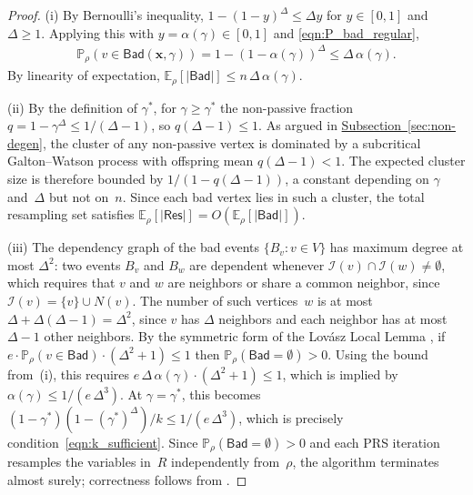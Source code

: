 \documentclass[12pt, a4paper]{article}
\theoremstyle{plain}
\theoremstyle{definition}
\theoremstyle{remark}
\newcommand{\mc}{\mathcal}
\newcommand{\mbb}{\mathbb}
\renewcommand{\v}[1]{\boldsymbol{#1}}
\newcommand{\mx}{\v{x}}
\newcommand{\sref}[2]{\hyperref[#2]{#1~\ref*{#2}}}
\newcommand{\bad}{\mathsf{Bad}}
\newcommand{\res}{\mathsf{Res}}
\begin{document}
\begin{proof}
(i) By Bernoulli's inequality, \(1-(1-y)^{\Delta}\leq \Delta y\) for \(y\in[0,1]\) and \(\Delta\geq1\). Applying this with \(y=\alpha(\gamma)\in[0,1]\) and \eqref{eqn:P_bad_regular},
\begin{align*}
\mbb P_\rho(v\in\bad(\mx,\gamma)) = 1-\left(1-\alpha(\gamma)\right)^{\Delta} \leq \Delta\,\alpha(\gamma).
\end{align*}
By linearity of expectation, \(\mbb E_\rho[|\bad|]\leq n\,\Delta\,\alpha(\gamma)\).

(ii) By the definition of \(\gamma^*\), for \(\gamma\geq\gamma^*\) the non-passive fraction \(q = 1-\gamma^{\Delta}\leq 1/(\Delta-1)\), so \(q(\Delta-1)\leq 1\). As argued in \sref{Subsection}{sec:non-degen}, the cluster of any non-passive vertex is dominated by a subcritical Galton--Watson process with offspring mean \(q(\Delta-1)<1\). The expected cluster size is therefore bounded by \(1/(1-q(\Delta-1))\), a constant depending on \(\gamma\) and~\(\Delta\) but not on~\(n\). Since each bad vertex lies in such a cluster, the total resampling set satisfies \(\mbb E_\rho[|\res|] = O(\mbb E_\rho[|\bad|])\).

(iii) The dependency graph of the bad events \(\{B_v:v\in V\}\) has maximum degree at most \(\Delta^2\): two events \(B_v\) and \(B_w\) are dependent whenever \(\mc I(v)\cap\mc I(w)\neq\emptyset\), which requires that \(v\) and \(w\) are neighbors or share a common neighbor, since \(\mc I(v)=\{v\}\cup N(v)\). The number of such vertices~\(w\) is at most \(\Delta+\Delta(\Delta-1)=\Delta^2\), since \(v\) has \(\Delta\) neighbors and each neighbor has at most \(\Delta-1\) other neighbors. By the symmetric form of the Lov\'asz Local Lemma \cite[Theorem 5.1.1]{AS16}, if \(e\cdot\mbb P_\rho(v\in\bad)\cdot(\Delta^2+1)\leq1\) then \(\mbb P_\rho(\bad=\emptyset)>0\). Using the bound from~(i), this requires \(e\,\Delta\,\alpha(\gamma)\cdot(\Delta^2+1)\leq1\), which is implied by \(\alpha(\gamma)\leq 1/(e\,\Delta^3)\). At \(\gamma=\gamma^*\), this becomes \((1-\gamma^*)(1-(\gamma^*)^{\Delta})/k\leq 1/(e\,\Delta^3)\), which is precisely condition~\eqref{eqn:k_sufficient}. Since \(\mbb P_\rho(\bad=\emptyset)>0\) and each PRS iteration resamples the variables in~\(R\) independently from~\(\rho\), the algorithm terminates almost surely; correctness follows from \cite[Theorem~4.5]{GJL17}.
\end{proof}
\end{document}
